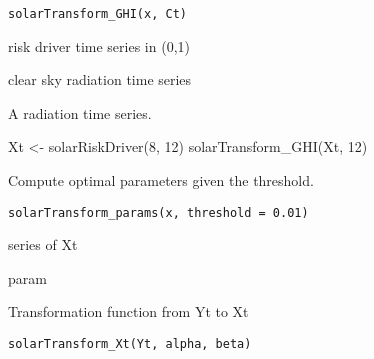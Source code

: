\documentclass[a4paper]{book}
\begin{document}
%
\begin{Usage}
\begin{verbatim}
solarTransform_GHI(x, Ct)
\end{verbatim}
\end{Usage}
%
\begin{Arguments}
\begin{ldescription}
\item[\code{x}] risk driver time series in (0,1)

\item[\code{Ct}] clear sky radiation time series
\end{ldescription}
\end{Arguments}
%
\begin{Value}
A radiation time series.
\end{Value}
%
\begin{Examples}
\begin{ExampleCode}
Xt <- solarRiskDriver(8, 12)
solarTransform_GHI(Xt, 12)
\end{ExampleCode}
\end{Examples}
%
\begin{Description}\relax
Compute optimal parameters given the threshold.
\end{Description}
%
\begin{Usage}
\begin{verbatim}
solarTransform_params(x, threshold = 0.01)
\end{verbatim}
\end{Usage}
%
\begin{Arguments}
\begin{ldescription}
\item[\code{x}] series of Xt

\item[\code{threshold}] param
\end{ldescription}
\end{Arguments}
%
\begin{Description}\relax
Transformation function from Yt to Xt
\end{Description}
%
\begin{Usage}
\begin{verbatim}
solarTransform_Xt(Yt, alpha, beta)
\end{verbatim}
\end{Usage}
\end{document}
